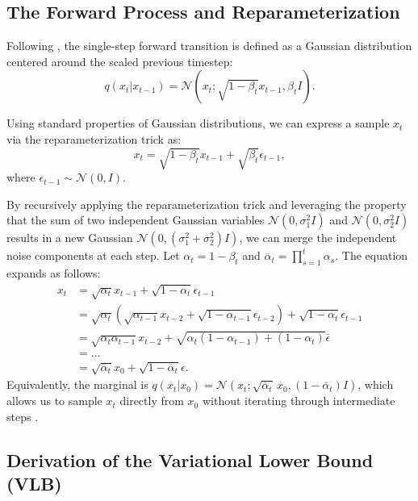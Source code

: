 \subsection{The Forward Process and Reparameterization}
\label{app:diffusion_forward}

Following \textcite{ho_denoising_2020}, the single-step forward transition is defined as a Gaussian distribution centered around the scaled previous timestep:
\begin{equation}
    q(x_t | x_{t-1}) = \mathcal{N}(x_t; \sqrt{1 - \beta_t} x_{t-1}, \beta_t I).
\end{equation}

Using standard properties of Gaussian distributions, we can express a sample $x_t$ via the reparameterization trick as:
\begin{equation}
    x_t = \sqrt{1-\beta_t}x_{t-1} + \sqrt{\beta_t}\epsilon_{t-1},
\end{equation}
where $\epsilon_{t-1} \sim \mathcal{N}(0,I)$. 

By recursively applying the reparameterization trick and leveraging the property that the sum of two independent Gaussian variables $\mathcal{N}(0, \sigma_1^2 I)$ and $\mathcal{N}(0, \sigma_2^2 I)$ results in a new Gaussian $\mathcal{N}(0, (\sigma_1^2 + \sigma_2^2)I)$, we can merge the independent noise components at each step. Let $\alpha_t = 1 - \beta_t$ and $\overline{\alpha}_{t} = \prod_{s=1}^{t}\alpha_{s}$. The equation expands as follows:
\begin{align}
    x_t &= \sqrt{\alpha_t}x_{t-1} + \sqrt{1-\alpha_t}\epsilon_{t-1} \nonumber \\
        &= \sqrt{\alpha_t}(\sqrt{\alpha_{t-1}}x_{t-2} + \sqrt{1-\alpha_{t-1}}\epsilon_{t-2}) + \sqrt{1-\alpha_t}\epsilon_{t-1} \nonumber \\
        &= \sqrt{\alpha_t \alpha_{t-1}}x_{t-2} + \sqrt{\alpha_t(1-\alpha_{t-1}) + (1-\alpha_t)}\bar{\epsilon} \nonumber \\
        &= \dots \nonumber \\
        &= \sqrt{\overline{\alpha}_{t}}x_{0} + \sqrt{1-\overline{\alpha}_{t}}\epsilon.
\end{align}
Equivalently, the marginal is $q(x_t | x_0) = \mathcal{N}(x_t; \sqrt{\overline{\alpha}_t}\,x_0, (1-\overline{\alpha}_t) I)$, which allows us to sample $x_t$ directly from $x_0$ without iterating through intermediate steps \parencite{ho_denoising_2020}.

\subsection{Derivation of the Variational Lower Bound (VLB)}
\label{app:diffusion_vlb}

